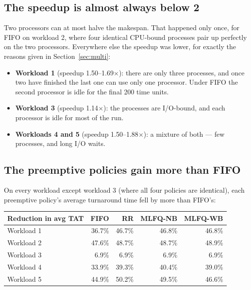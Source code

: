 \documentclass[11pt,a4paper]{article}
\begin{document}
\subsection{The speedup is almost always below 2}

Two processors can at most halve the makespan. That happened only once, for FIFO on
workload 2, where four identical CPU-bound processes pair up perfectly on the two processors.
Everywhere else the speedup was lower, for exactly the reasons given in Section~\ref{sec:multi}:
\begin{itemize}\itemsep1pt
  \item \textbf{Workload 1} (speedup 1.50--1.69$\times$): there are only three processes, and
        once two have finished the last one can use only one processor. Under FIFO the second
        processor is idle for the final 200 time units.
  \item \textbf{Workload 3} (speedup 1.14$\times$): the processes are I/O-bound, and each
        processor is idle for most of the run.
  \item \textbf{Workloads 4 and 5} (speedup 1.50--1.88$\times$): a mixture of both --- few
        processes, and long I/O waits.
\end{itemize}

\subsection{The preemptive policies gain more than FIFO}

On every workload except workload 3 (where all four policies are identical), each preemptive
policy's average turnaround time fell by more than FIFO's:

\begin{center}\small
\begin{tabular}{lrrrr}
\toprule
\textbf{Reduction in avg TAT} & \textbf{FIFO} & \textbf{RR} & \textbf{MLFQ-NB} & \textbf{MLFQ-WB}\\
\midrule
Workload 1 & 36.7\% & 46.7\% & 46.8\% & 46.8\% \\
Workload 2 & 47.6\% & 48.7\% & 48.7\% & 48.9\% \\
Workload 3 & 6.9\% & 6.9\% & 6.9\% & 6.9\% \\
Workload 4 & 33.9\% & 39.3\% & 40.4\% & 39.0\% \\
Workload 5 & 44.9\% & 50.2\% & 49.5\% & 46.6\% \\
\bottomrule\end{tabular}\end{center}
\end{document}
